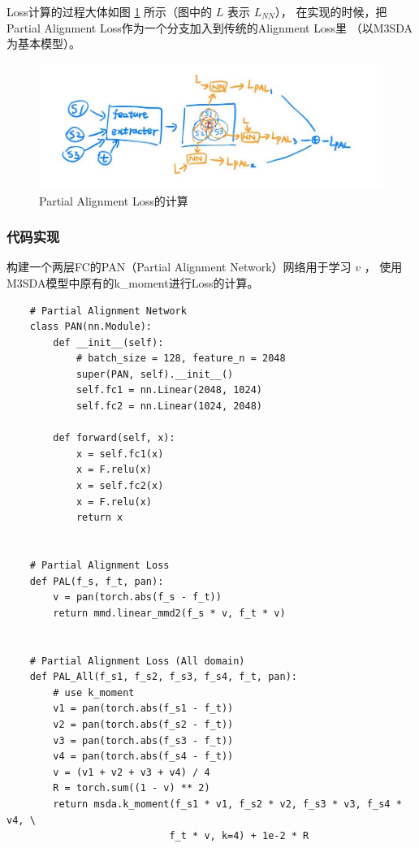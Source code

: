 \documentclass[UTF8]{ctexart}
\begin{document}
                Loss计算的过程大体如图 \ref{fig:PAL} 所示（图中的 $L$ 表示 $L_{NN}$），
                在实现的时候，把Partial Alignment Loss作为一个分支加入到传统的Alignment Loss里
                （以M3SDA为基本模型）。

                \begin{figure}
                    \centering
                    \includegraphics{Week03_PAL.png}
                    \caption{Partial Alignment Loss的计算}
                    \label{fig:PAL}
                \end{figure}
            \subsubsection{代码实现}
                构建一个两层FC的PAN（Partial Alignment Network）网络用于学习 $v$ ，
                使用M3SDA模型中原有的k\_moment进行Loss的计算。
                \begin{verbatim}
    # Partial Alignment Network
    class PAN(nn.Module):
        def __init__(self):
            # batch_size = 128, feature_n = 2048
            super(PAN, self).__init__()
            self.fc1 = nn.Linear(2048, 1024)
            self.fc2 = nn.Linear(1024, 2048)

        def forward(self, x):
            x = self.fc1(x)
            x = F.relu(x)
            x = self.fc2(x)
            x = F.relu(x)
            return x


    # Partial Alignment Loss
    def PAL(f_s, f_t, pan):
        v = pan(torch.abs(f_s - f_t))
        return mmd.linear_mmd2(f_s * v, f_t * v)


    # Partial Alignment Loss (All domain)
    def PAL_All(f_s1, f_s2, f_s3, f_s4, f_t, pan):
        # use k_moment
        v1 = pan(torch.abs(f_s1 - f_t))
        v2 = pan(torch.abs(f_s2 - f_t))
        v3 = pan(torch.abs(f_s3 - f_t))
        v4 = pan(torch.abs(f_s4 - f_t))
        v = (v1 + v2 + v3 + v4) / 4
        R = torch.sum((1 - v) ** 2)
        return msda.k_moment(f_s1 * v1, f_s2 * v2, f_s3 * v3, f_s4 * v4, \
                            f_t * v, k=4) + 1e-2 * R
                \end{verbatim}
\end{document}
